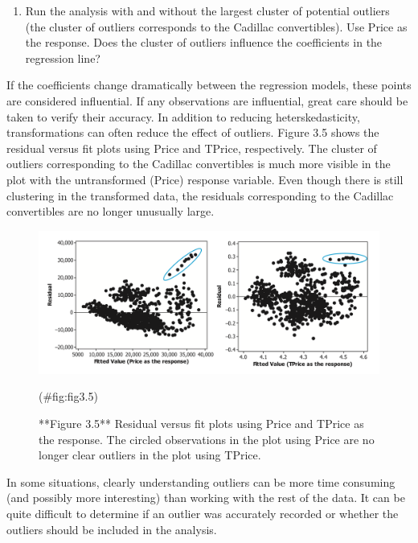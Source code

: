 \documentclass[
]{report}
\providecommand{\tightlist}{%
  \setlength{\itemsep}{0pt}\setlength{\parskip}{0pt}}
\begin{document}
\begin{enumerate}
\def\labelenumi{\arabic{enumi}.}
\setcounter{enumi}{11}
\tightlist
\item
  Run the analysis with and without the largest cluster of potential outliers (the cluster of outliers corresponds to the Cadillac convertibles). Use Price as the response. Does the cluster of outliers influence the coefficients in the regression line?
\end{enumerate}

If the coefficients change dramatically between the regression models, these points are considered influential. If any observations are influential, great care should be taken to verify their accuracy. In addition to reducing heterskedasticity, transformations can often reduce the effect of outliers. Figure 3.5 shows the residual versus fit plots using Price and TPrice, respectively. The cluster of outliers corresponding to the Cadillac convertibles is much more visible in the plot with the untransformed (Price) response
variable. Even though there is still clustering in the transformed data, the residuals corresponding to the Cadillac convertibles are no longer unusually large.

\begin{figure}

{\centering \includegraphics[width=1\linewidth]{docs/Fig3_5} 

}

\caption{**Figure 3.5** Residual versus fit plots using Price and TPrice as the response. The circled observations in the plot using Price are no longer clear outliers in the plot using TPrice.}(\#fig:fig3.5)
\end{figure}

In some situations, clearly understanding outliers can be more time consuming (and possibly more interesting) than working with the rest of the data. It can be quite difficult to determine if an outlier was accurately recorded or whether the outliers should be included in the analysis.
\end{document}
